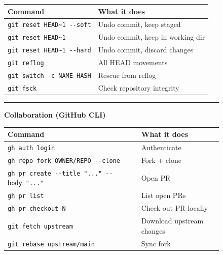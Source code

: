 \documentclass[
  9pt,
  a4paper,
  DIV=11,
  numbers=noendperiod]{scrartcl}
\begin{document}
\begin{figure}
\begin{minipage}{0.50\linewidth}
\begin{longtable}[]{@{}ll@{}}
\toprule\noalign{}
Command & What it does \\
\midrule\noalign{}
\endhead
\bottomrule\noalign{}
\endlastfoot
\texttt{git\ reset\ HEAD\textasciitilde{}1\ -\/-soft} & Undo commit,
keep staged \\
\texttt{git\ reset\ HEAD\textasciitilde{}1} & Undo commit, keep in
working dir \\
\texttt{git\ reset\ HEAD\textasciitilde{}1\ -\/-hard} & Undo commit,
discard changes \\
\texttt{git\ reflog} & All HEAD movements \\
\texttt{git\ switch\ -c\ NAME\ HASH} & Rescue from reflog \\
\texttt{git\ fsck} & Check repository integrity \\
\end{longtable}

\end{minipage}%
%
\begin{minipage}{0.50\linewidth}

\begin{center}\rule{0.5\linewidth}{0.5pt}\end{center}

\end{minipage}%
\newline
\begin{minipage}{0.50\linewidth}
\textbf{Collaboration (GitHub CLI)}\end{minipage}%
%
\begin{minipage}{0.50\linewidth}

\begin{longtable}[]{@{}ll@{}}
\toprule\noalign{}
Command & What it does \\
\midrule\noalign{}
\endhead
\bottomrule\noalign{}
\endlastfoot
\texttt{gh\ auth\ login} & Authenticate \\
\texttt{gh\ repo\ fork\ OWNER/REPO\ -\/-clone} & Fork + clone \\
\texttt{gh\ pr\ create\ -\/-title\ "..."\ -\/-body\ "..."} & Open PR \\
\texttt{gh\ pr\ list} & List open PRs \\
\texttt{gh\ pr\ checkout\ N} & Check out PR locally \\
\texttt{git\ fetch\ upstream} & Download upstream changes \\
\texttt{git\ rebase\ upstream/main} & Sync fork \\
\end{longtable}


\end{minipage}
\end{figure}
\end{document}
